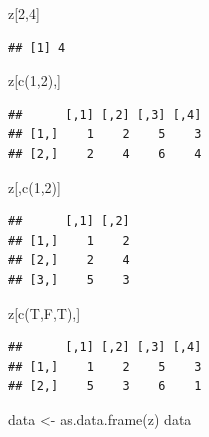 \documentclass[]{article}
\newenvironment{Shaded}{\begin{snugshade}}{\end{snugshade}}
\newcommand{\DecValTok}[1]{\textcolor[rgb]{0.00,0.00,0.81}{#1}}
\newcommand{\FunctionTok}[1]{\textcolor[rgb]{0.00,0.00,0.00}{#1}}
\newcommand{\NormalTok}[1]{#1}
\newcommand{\OtherTok}[1]{\textcolor[rgb]{0.56,0.35,0.01}{#1}}
\begin{document}
\begin{Shaded}
\begin{Highlighting}[]
\NormalTok{z[}\DecValTok{2}\NormalTok{,}\DecValTok{4}\NormalTok{]}
\end{Highlighting}
\end{Shaded}

\begin{verbatim}
## [1] 4
\end{verbatim}

\begin{Shaded}
\begin{Highlighting}[]
\NormalTok{z[}\FunctionTok{c}\NormalTok{(}\DecValTok{1}\NormalTok{,}\DecValTok{2}\NormalTok{),]}
\end{Highlighting}
\end{Shaded}

\begin{verbatim}
##      [,1] [,2] [,3] [,4]
## [1,]    1    2    5    3
## [2,]    2    4    6    4
\end{verbatim}

\begin{Shaded}
\begin{Highlighting}[]
\NormalTok{z[,}\FunctionTok{c}\NormalTok{(}\DecValTok{1}\NormalTok{,}\DecValTok{2}\NormalTok{)]}
\end{Highlighting}
\end{Shaded}

\begin{verbatim}
##      [,1] [,2]
## [1,]    1    2
## [2,]    2    4
## [3,]    5    3
\end{verbatim}

\begin{Shaded}
\begin{Highlighting}[]
\NormalTok{z[}\FunctionTok{c}\NormalTok{(T,F,T),]}
\end{Highlighting}
\end{Shaded}

\begin{verbatim}
##      [,1] [,2] [,3] [,4]
## [1,]    1    2    5    3
## [2,]    5    3    6    1
\end{verbatim}

\begin{Shaded}
\begin{Highlighting}[]
\NormalTok{data }\OtherTok{\textless{}{-}} \FunctionTok{as.data.frame}\NormalTok{(z)}
\NormalTok{data}
\end{Highlighting}
\end{Shaded}
\end{document}
